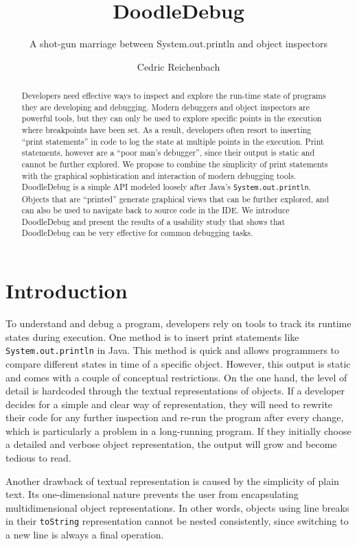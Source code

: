 \documentclass[english]{scrartcl}
\newcommand{\DD}{Dood\-le\-De\-bug\xspace}
\newcommand{\println}{\texttt{Sys\-tem.\-out.\-println}\xspace}
\begin{document}
\title{DoodleDebug}
\author{Cedric Reichenbach}
\subtitle{A shot-gun marriage between System.out.println and object inspectors}
\maketitle

\begin{abstract}
Developers need effective ways to inspect and explore the run-time state of programs they are developing and debugging.  Modern debuggers and object inspectors are powerful tools, but they can only be used to explore specific points in the execution where breakpoints have been set. As a result, developers often resort to inserting ``print statements'' in code to log the state at multiple points in the execution. Print statements, however are a ``poor man's debugger'', since their output is static and cannot be further explored.
We propose to combine the simplicity of print statements with the graphical sophistication and interaction of modern debugging tools.
\DD is a simple API modeled loosely after Java's \println. Objects that are ``printed'' generate graphical views that can be further explored, and can also be used to navigate back to source code in the IDE.
We introduce \DD and present the results of a usability study that shows that \DD can be very effective for common debugging tasks.
\end{abstract}

\section{Introduction}

To understand and debug a program, developers rely on tools to track its runtime states during execution.
One method is to insert print statements like \println in Java.
This method is quick and allows programmers to compare different states in time of a specific object.
However, this output is static and comes with a couple of conceptual restrictions. On the one hand, the level of detail is hardcoded through the textual representations of objects.
If a developer decides for a simple and clear way of representation, they will need to rewrite their code for any further inspection and re-run the program after every change, which is particularly a problem in a long-running program.
If they initially choose a detailed and verbose object representation, the output will grow and become tedious to read.

Another drawback of textual representation is caused by the simplicity of plain text.
Its one-dimensional nature prevents the user from encapsulating multidimensional object representations.
In other words, objects using line breaks in their \texttt{toString} representation cannot be nested consistently, since switching to a new line is always a final operation.
\end{document}

